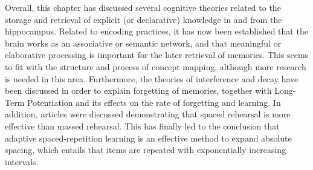 Overall, this chapter has discussed several cognitive theories related to the storage and retrieval of explicit (or declarative) knowledge in and from the hippocampus. Related to encoding practices, it has now been established that the brain works as an associative or semantic network, and that meaningful or elaborative processing is important for the later retrieval of memories. This seems to fit with the structure and process of concept mapping, although more research is needed in this area. Furthermore, the theories of interference and decay have been discussed in order to explain forgetting of memories, together with Long-Term Potentiation and its effects on the rate of forgetting and learning. In addition, articles were discussed demonstrating that spaced rehearsal is more effective than massed rehearsal. This has finally led to the conclusion that adaptive spaced-repetition learning is an effective method to expand absolute spacing, which entails that items are repeated with exponentially increasing intervals.
